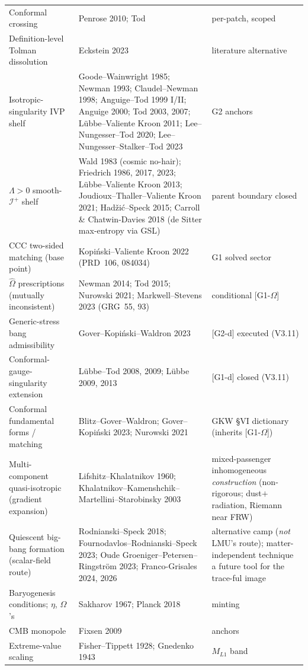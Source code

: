 \documentclass[11pt]{article}
\begin{document}
\begin{small}
\begin{longtable}{p{}p{}p{}}
Conformal crossing & Penrose 2010; Tod & per-patch, scoped\\
Definition-level Tolman dissolution & Eckstein 2023 & literature alternative\\
Isotropic-singularity IVP shelf & Goode--Wainwright 1985; Newman 1993; Claudel--Newman 1998; Anguige--Tod 1999 I/II; Anguige 2000; Tod 2003, 2007; L\"ubbe--Valiente Kroon 2011; Lee--Nungesser--Tod 2020; Lee--Nungesser--Stalker--Tod 2023 & G2 anchors\\
$\Lambda>0$ smooth-$\mathscr I^+$ shelf & Wald 1983 (cosmic no-hair); Friedrich 1986, 2017, 2023; L\"ubbe--Valiente Kroon 2013; Joudioux--Thaller--Valiente Kroon 2021; Had\v{z}i\'c--Speck 2015; Carroll \& Chatwin-Davies 2018 (de Sitter max-entropy via GSL) & parent boundary closed\\
CCC two-sided matching (base point) & Kopi\'nski--Valiente Kroon 2022 (PRD~106, 084034) & G1 solved sector\\
$\hat\Omega$ prescriptions (mutually inconsistent) & Newman 2014; Tod 2015; Nurowski 2021; Markwell--Stevens 2023 (GRG~55, 93) & conditional [G1-$\Omega$]\\
Generic-stress bang admissibility & Gover--Kopi\'nski--Waldron 2023 & [G2-d] executed (V3.11)\\
Conformal-gauge-singularity extension & L\"ubbe--Tod 2008, 2009; L\"ubbe 2009, 2013 & [G1-d] closed (V3.11)\\
Conformal fundamental forms / matching & Blitz--Gover--Waldron; Gover--Kopi\'nski 2023; Nurowski 2021 & GKW \S VI dictionary (inherits [G1-$\Omega$])\\
Multi-component quasi-isotropic (gradient expansion) & Lifshitz--Khalatnikov 1960; Khalatnikov--Kamenshchik--Martellini--Starobinsky 2003 & mixed-passenger inhomogeneous \emph{construction} (non-rigorous; dust$+$radiation, Riemann near FRW)\\
Quiescent big-bang formation (scalar-field route) & Rodnianski--Speck 2018; Fournodavlos--Rodnianski--Speck 2023; Oude Groeniger--Petersen--Ringstr\"om 2023; Franco-Grisales 2024, 2026 & alternative camp (\emph{not} LMU's route); matter-independent technique a future tool for the trace-ful image\\
Baryogenesis conditions; $\eta$, $\Omega$'s & Sakharov 1967; Planck 2018 & minting\\
CMB monopole & Fixsen 2009 & anchors\\
Extreme-value scaling & Fisher--Tippett 1928; Gnedenko 1943 & $M_{L1}$ band\\

\end{longtable}
\end{small}
\end{document}

